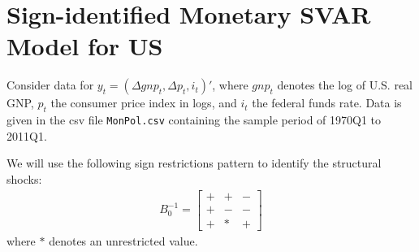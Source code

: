 \documentclass{article}
\begin{document}
\begin{enumerate}
\end{enumerate}

\newpage

\section[Sign-identified Monetary SVAR Model for US]{Sign-identified Monetary SVAR Model for US\label{ex:SignIdentifiedMonetarySVARUS}}
Consider data for \(y_t = (\Delta gnp_t,\Delta p_t,i_t)'\),
  where \(gnp_t\) denotes the log of U.S. real GNP,
  \(p_t\) the consumer price index in logs,
  and \(i_t\) the federal funds rate.
  Data is given in the csv file \texttt{MonPol.csv} containing the sample period of 1970Q1 to 2011Q1.

We will use the following sign restrictions pattern to identify the structural shocks:
\begin{align}
B_0^{-1}=\begin{bmatrix}
+ & + & -\\
+ & - & -\\
+ & *  & +
\label{eq:signpattern}
\end{bmatrix}
\end{align}
where \(*\) denotes an unrestricted value.
\end{document}
